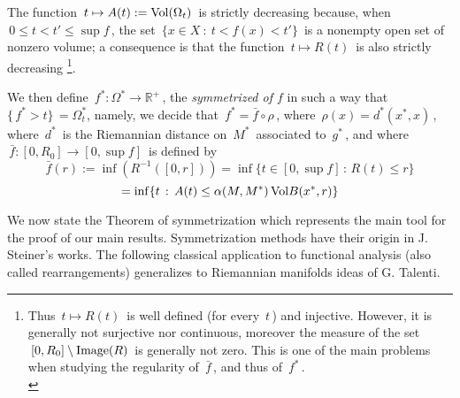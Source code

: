 \documentclass[11pt, reqno]{amsart}
\theoremstyle{plain}
\begin{document}
The function $\, t \mapsto A(t) := {\rm Vol} (\Omega_t)\,$ is strictly decreasing because,
when $\,0 \le t < t' \le \sup f\,$, the set $\,\{ x \in X \ :\ t <f(x) < t'\}\,$ is a nonempty open set of 
nonzero volume; a consequence is that the function $\, t \mapsto R(t)\,$ is also strictly
decreasing
\footnote{Thus $\, t \mapsto R(t)\,$ is well defined (for every $\,t\,$) and injective.
However, it is generally not surjective nor continuous, moreover the measure of the set
$\,[0 , R_0] \setminus {\rm Image} (R)\,$ is generally not zero. This is one of the main problems when studying the regularity of $\,\bar f\,$,
and thus of $\,f^*\,$.\\}.

We then define $\, f^* : \Omega^* \to \mathbb R^+\,$, the \emph{symmetrized of $f$} in such a way that $\{\,f^* > t\}\, = \Omega^*_t$, namely, 
we decide that $\,f^* = \bar f \circ \rho\,$, where
$\,\rho (x) = d^* (x^* , x)\,$, where $\,d^*\,$ is the Riemannian distance on $\,M^*\,$ associated
to $\,g^*\,$, and where $\,\bar f : [0 , R_0] \to [0 , \sup f]\,$ is defined by
$$\bar f (r) := \inf \left( R^{-1} ([0 , r ]) \right) =\inf \{t\in [0 , \sup f]\, :\, R(t) \le r \}$$
$$ = 
\inf \{t\, :\, A(t) \le \alpha (M,M^*) \,{\rm Vol} B(x^* , r) \}$$

We now state the Theorem of symmetrization which represents the main tool
for the proof of our main results. Symmetrization methods have their origin in J. Steiner's works. The following classical application to functional analysis (also called rearrangements) generalizes to Riemannian manifolds ideas of G. Talenti.
\end{document}
